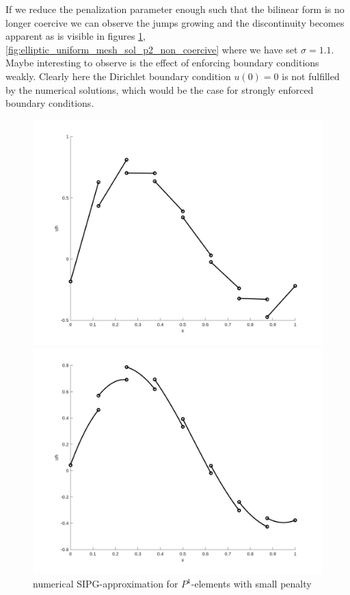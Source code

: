 If we reduce the penalization parameter enough such that the bilinear form 
is no longer coercive we can observe the jumps growing and the discontinuity becomes apparent as is visible in figures 
\ref{fig:elliptic_uniform_mesh_sol_p1_non_coercive}, \ref{fig:elliptic_uniform_mesh_sol_p2_non_coercive} where we have set $\sigma = 1.1$. 
Maybe interesting to observe is the effect of enforcing boundary conditions weakly. Clearly here the Dirichlet boundary condition $u(0) = 0$ is 
not fulfilled by the numerical solutions, which would be the case for strongly enforced boundary conditions. \\

\begin{figure}[h!]
    \centering
    
    \begin{minipage}[t]{0.48\textwidth}
        \centering
        \includegraphics[width=\linewidth]{figures/dg_elliptic_num_sol_non_coercive_p1.jpg}
        \caption{numerical SIPG-approximation for $P^1$-elements with small penalty}
        \label{fig:elliptic_uniform_mesh_sol_p1_non_coercive}
    \end{minipage}
    \hfill
    \begin{minipage}[t]{0.48\textwidth}
        \centering
        \includegraphics[width=\linewidth]{figures/dg_elliptic_num_sol_non_coercive_p2.jpg}

\end{minipage}
\end{figure}
